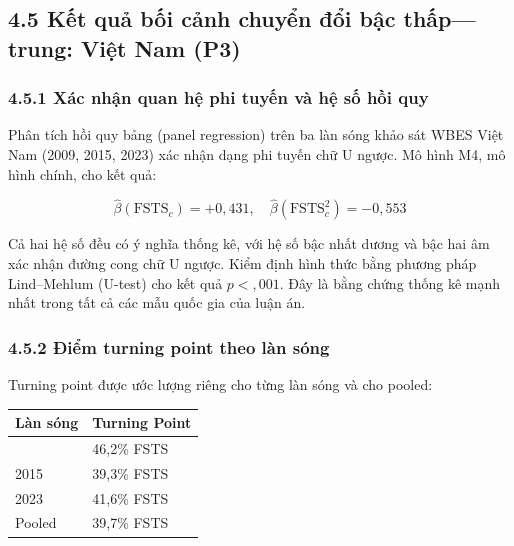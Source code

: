 \documentclass[12pt,a4paper]{article}
\begin{document}
\hypertarget{45-kux1ebft-quux1ea3-bux1ed1i-cux1ea3nh-chuyux1ec3n-ux111ux1ed5i-bux1eadc-thux1ea5ptrung-viux1ec7t-nam-p3}{%
\subsection{4.5 Kết quả bối cảnh chuyển đổi bậc thấp---trung: Việt Nam
(P3)}\label{45-kux1ebft-quux1ea3-bux1ed1i-cux1ea3nh-chuyux1ec3n-ux111ux1ed5i-bux1eadc-thux1ea5ptrung-viux1ec7t-nam-p3}}

\hypertarget{451-xuxe1c-nhux1eadn-quan-hux1ec7-phi-tuyux1ebfn-vuxe0-hux1ec7-sux1ed1-hux1ed3i-quy}{%
\subsubsection{4.5.1 Xác nhận quan hệ phi tuyến và hệ số hồi
quy}\label{451-xuxe1c-nhux1eadn-quan-hux1ec7-phi-tuyux1ebfn-vuxe0-hux1ec7-sux1ed1-hux1ed3i-quy}}

Phân tích hồi quy bảng (panel regression) trên ba làn sóng khảo sát WBES
Việt Nam (2009, 2015, 2023) xác nhận dạng phi tuyến chữ U ngược. Mô hình
M4, mô hình chính, cho kết quả:

\[\hat{\beta}(\text{FSTS}_c) = +0{,}431, \quad \hat{\beta}(\text{FSTS}_c^2) = -0{,}553\]

Cả hai hệ số đều có ý nghĩa thống kê, với hệ số bậc nhất dương và bậc
hai âm xác nhận đường cong chữ U ngược. Kiểm định hình thức bằng phương
pháp Lind--Mehlum (U-test) cho kết quả \(p < {,}001\). Đây là bằng chứng
thống kê mạnh nhất trong tất cả các mẫu quốc gia của luận án.

\hypertarget{452-ux111iux1ec3m-turning-point-theo-luxe0n-suxf3ng}{%
\subsubsection{4.5.2 Điểm turning point theo làn
sóng}\label{452-ux111iux1ec3m-turning-point-theo-luxe0n-suxf3ng}}

Turning point được ước lượng riêng cho từng làn sóng và cho pooled:

\begin{longtable}[]{@{}ll@{}}
\toprule\noalign{}
Làn sóng & Turning Point \\
\midrule\noalign{}
\endhead
\bottomrule\noalign{}
\endlastfoot
2009 & 46,2\% FSTS \\
2015 & 39,3\% FSTS \\
2023 & 41,6\% FSTS \\
Pooled & 39,7\% FSTS \\
\end{longtable}
\end{document}
